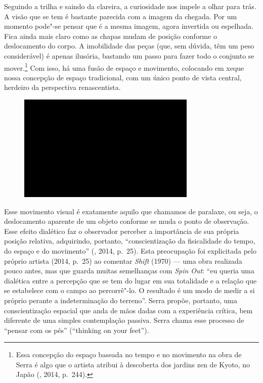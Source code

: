 Seguindo a trilha e saindo da clareira, a curiosidade nos impele a olhar
para trás. A visão que se tem é bastante parecida com a imagem da
chegada. Por um momento pode"-se pensar que é a mesma imagem, agora
invertida ou espelhada. Fica ainda mais claro como as chapas mudam de
posição conforme o deslocamento do corpo. A imobilidade das peças (que,
sem dúvida, têm um peso considerável) é apenas ilusória, bastando um
passo para fazer todo o conjunto se mover.\footnote{Essa concepção do
  espaço baseada no tempo e no movimento na obra de Serra é algo que o
  artista atribui à descoberta dos jardins zen de Kyoto, no Japão
  (, 2014, p.~244).} Com isso, há uma fusão de espaço e movimento,
colocando em xeque nossa concepção de espaço tradicional, com um único
ponto de vista central, herdeiro da perspectiva renascentista.

\begin{figure}[!ht]

\centering
 \includegraphics[width=85mm]{./imgs/im1.jpg}
\caption{\tiny{}}

\end{figure}

Esse movimento visual é exatamente aquilo que chamamos de paralaxe, ou
seja, o deslocamento aparente de um objeto conforme se muda o ponto de
observação. Esse efeito dialético faz o observador perceber a
importância de sua própria posição relativa, adquirindo, portanto,
``conscientização da fisicalidade do tempo, do espaço e do movimento''
(, 2014, p.~25). Esta preocupação foi explicitada pelo próprio
artista (2014, p.~25) ao comentar \emph{Shift} (1970) --- uma obra
realizada pouco antes, mas que guarda muitas semelhanças com \emph{Spin
Out}: ``eu queria uma dialética entre a percepção que se tem do lugar em
sua totalidade e a relação que se estabelece com o campo ao percorrê"-lo.
O resultado é um modo de medir a si próprio perante a indeterminação do
terreno''. Serra propõe, portanto, uma conscientização espacial que anda
de mãos dadas com a experiência crítica, bem diferente de uma simples
contemplação passiva. Serra chama esse processo de ``pensar com os pés''
(``thinking on your feet'').

